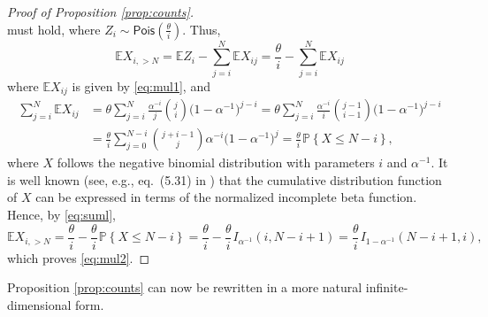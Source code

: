\documentclass[11pt]{article}
\newcommand{\hs}{\hspace{1pt}}
\newcommand{\E}{\mathbb{E}}
\renewcommand{\P}[1]{\mathbb{P}{\left\{#1\right\}}}
\newcommand{\1}[1][]{
	\ifx&#1&\mathds{1}
	\else\mathds{1}\left\{#1\right\}\fi}
\newcommand{\Pois}[1]{\mathsf{Pois}(#1)}
\theoremstyle{definition}
\theoremstyle{remark}
\numberwithin{equation}{section}
\begin{document}
\begin{proof}[Proof of Proposition \ref{prop:counts}]
\begin{equation*}
		\end{equation*}            
		must hold, where $Z_i \sim \Pois{\frac{\theta}{i}}$. Thus, 
		\begin{equation}\label{eq:suml}
			\E X_{i, >N} = \E Z_i - \sum_{j=i}^N \E X_{ij} = \frac{\theta}{i} - \sum_{j=i}^N \E X_{ij}
		\end{equation}
		where $\E X_{ij}$ is given by \eqref{eq:mul1}, and
		\begin{equation}
			\label{eq:suml-}
			\begin{aligned}
				\sum_{j=i}^N \E X_{ij} &= \theta
				\sum_{j=i}^N \frac{\alpha^{-i}}{j} \binom{j}{i} \bigl(1-\alpha^{-1}\bigr)^{j-i} =
				\theta \sum_{j=i}^N\frac{\alpha^{-i}}{i} \binom{j-1}{i-1} \bigl(1-\alpha^{-1}\bigr)^{j-i} \\ &=
				\frac{\theta}{i} \sum_{j=0}^{N-i}\binom{j+i-1}{j} \alpha^{-i}
				\bigl(1-\alpha^{-1}\bigr)^j = \frac{\theta}{i} \hs\P{X\le N-i},
			\end{aligned}
		\end{equation}
		where $X$ follows the negative binomial distribution with parameters $i$ and $\alpha^{-1}$.
		It is well known (see, e.g., eq.\ (5.31) in \cite{JKK05}) that the cumulative distribution function of $X$
		can be expressed in terms of the normalized incomplete beta function. Hence, by \eqref{eq:suml},
		\begin{equation*}
			\E X_{i, >N} = \frac{\theta}{i} - \frac{\theta}{i} \hs\P{X\le N-i} =
			\frac{\theta}{i} - \frac{\theta}{i} \hs I_{\alpha^{-1}}(i,N-i+1) =
			\frac{\theta}{i} \hs I_{1-\alpha^{-1}}(N-i+1,i),
		\end{equation*}
		which proves \eqref{eq:mul2}.
	\end{proof}
	
	Proposition \ref{prop:counts} can now be rewritten in a more natural infinite-dimensional form.
	
\end{document}
